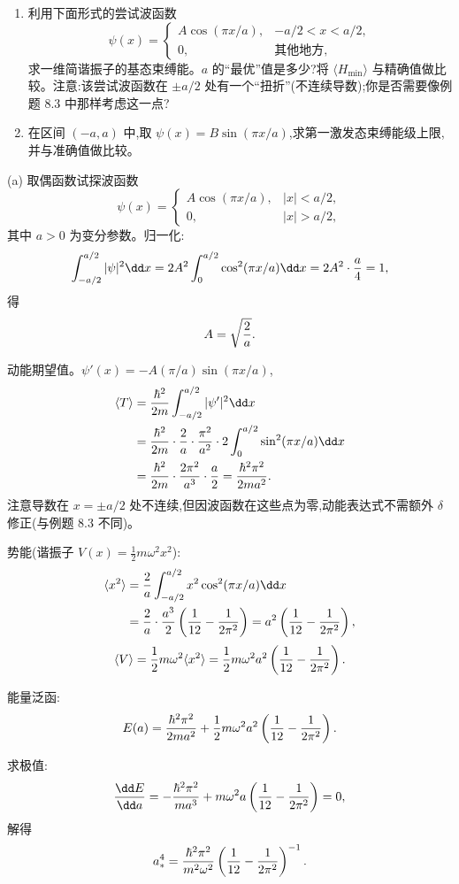 \begin{question}
\begin{enumerate}
\item 利用下面形式的尝试波函数
\[
\psi(x)=\begin{cases} A\cos(\pi x/a), & -a/2<x<a/2,\\ 0, & \text{其他地方},\end{cases}
\]
求一维简谐振子的基态束缚能。$a$ 的“最优”值是多少?将 $\langle H_{\min}\rangle$ 与精确值做比较。注意:该尝试波函数在 $\pm a/2$ 处有一个“扭折”(不连续导数);你是否需要像例题 8.3 中那样考虑这一点?
\item 在区间 $(-a,a)$ 中,取 $\psi(x)=B\sin(\pi x/a)$,求第一激发态束缚能级上限,并与准确值做比较。
\end{enumerate}
\begin{solution}
(a) 取偶函数试探波函数
\[
\psi(x)=\begin{cases}
A\cos(\pi x/a), & |x|<a/2,\\
0, & |x|>a/2,
\end{cases}
\]
其中 $a>0$ 为变分参数。归一化:
\[
\int_{-a/2}^{a/2}|\psi|^2\dd x=2A^2\int_0^{a/2}\cos^2(\pi x/a)\dd x
=2A^2\cdot{a\over4}=1,
\]
得
\[
A=\sqrt{2\over a}.
\]

动能期望值。$\psi'(x)=-A(\pi/a)\sin(\pi x/a)$,
\[
\begin{aligned}\langle T\rangle={}&{\hbar^2\over2m}\int_{-a/2}^{a/2}|\psi'|^2\dd x\\={}&{\hbar^2\over2m}\cdot{2\over a}\cdot{\pi^2\over a^2}\cdot2\int_0^{a/2}\sin^2(\pi x/a)\dd x\\={}&{\hbar^2\over2m}\cdot{2\pi^2\over a^3}\cdot{a\over2}={\hbar^2\pi^2\over2ma^2}.\end{aligned}
\]
注意导数在 $x=\pm a/2$ 处不连续,但因波函数在这些点为零,动能表达式不需额外 $\delta$ 修正(与例题 8.3 不同)。

势能(谐振子 $V(x)=\frac12m\omega^2x^2$):
\[
\begin{aligned}\langle x^2\rangle={}&{2\over a}\int_{-a/2}^{a/2}x^2\cos^2(\pi x/a)\dd x\\={}&{2\over a}\cdot{a^3\over2}\left({1\over12}-{1\over2\pi^2}\right)=a^2\left({1\over12}-{1\over2\pi^2}\right),\end{aligned}
\]
\[
\langle V\rangle={1\over2}m\omega^2\langle x^2\rangle
={1\over2}m\omega^2a^2\left({1\over12}-{1\over2\pi^2}\right).
\]

能量泛函:
\[
E(a)={\hbar^2\pi^2\over2ma^2}+{1\over2}m\omega^2a^2\left({1\over12}-{1\over2\pi^2}\right).
\]

求极值:
\[
{\dd E\over\dd a}=-{\hbar^2\pi^2\over ma^3}+m\omega^2a\left({1\over12}-{1\over2\pi^2}\right)=0,
\]
解得
\[
a_*^4={\hbar^2\pi^2\over m^2\omega^2}\left({1\over12}-{1\over2\pi^2}\right)^{-1}.
\]


\end{solution}
\end{question}
